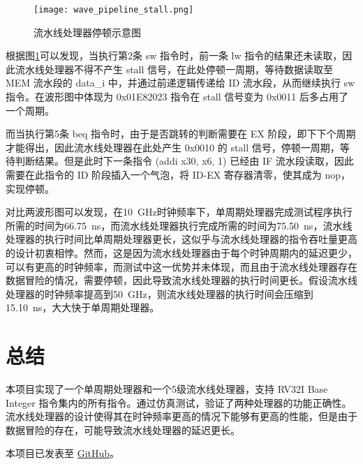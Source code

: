 \documentclass[lang=zh]{sjtureport}
\begin{document}
\begin{figure}[!htp]
	\centering
	\texttt{[image: wave\_pipeline\_stall.png]}
	\caption{流水线处理器停顿示意图}
	\label{fig:pipeline_stall}
\end{figure}

根据图\ref{fig:pipeline_stall}可以发现，当执行第2条 sw 指令时，前一条 lw 指令的结果还未读取，因此流水线处理器不得不产生 stall 信号，在此处停顿一周期，等待数据读取至 MEM 流水段的 data\_i 中，并通过前递逻辑传递给 ID 流水段，从而继续执行 sw 指令。在波形图中体现为 0x01E82023 指令在 stall 信号变为 0x0011 后多占用了一个周期。

而当执行第5条 beq 指令时，由于是否跳转的判断需要在 EX 阶段，即下下个周期才能得出，因此流水线处理器在此处产生 0x0010 的 stall 信号，停顿一周期，等待判断结果。但是此时下一条指令 (addi x30, x6, 1) 已经由 IF 流水段读取，因此需要在此指令的 ID 阶段插入一个气泡，将 ID-EX 寄存器清零，使其成为 nop，实现停顿。

对比两波形图可以发现，在\SI{10}{\GHz}时钟频率下，单周期处理器完成测试程序执行所需的时间为\SI{66.75}{\ns}，而流水线处理器执行完成所需的时间为\SI{75.50}{\ns}，流水线处理器的执行时间比单周期处理器更长，这似乎与流水线处理器的指令吞吐量更高的设计初衷相悖。然而，这是因为流水线处理器由于每个时钟周期内的延迟更少，可以有更高的时钟频率，而测试中这一优势并未体现，而且由于流水线处理器存在数据冒险的情况，需要停顿，因此导致流水线处理器的执行时间更长。假设流水线处理器的时钟频率提高到\SI{50}{\GHz}，则流水线处理器的执行时间会压缩到\SI{15.10}{\ns}，大大快于单周期处理器。

\chapter{总结}

本项目实现了一个单周期处理器和一个5级流水线处理器，支持 RV32I Base Integer 指令集内的所有指令。通过仿真测试，验证了两种处理器的功能正确性。流水线处理器的设计使得其在时钟频率更高的情况下能够有更高的性能，但是由于数据冒险的存在，可能导致流水线处理器的延迟更长。

本项目已发表至 \href{https://github.com/ShabbyGayBar/RISCV_CPU}{GitHub}。


\nocite{*}
\printbibliography

\end{document}
